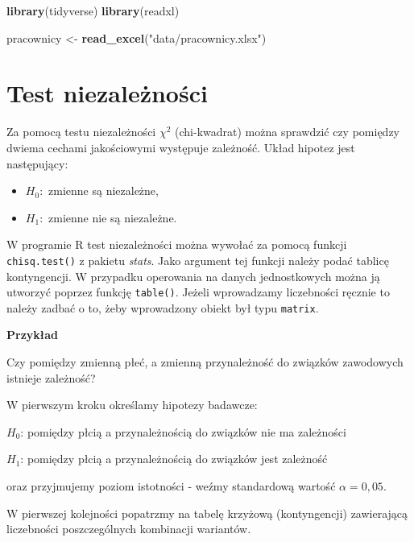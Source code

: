 \documentclass[
]{book}
\newenvironment{Shaded}{\begin{snugshade}}{\end{snugshade}}
\newcommand{\KeywordTok}[1]{\textcolor[rgb]{0.13,0.29,0.53}{\textbf{#1}}}
\newcommand{\NormalTok}[1]{#1}
\newcommand{\OperatorTok}[1]{\textcolor[rgb]{0.81,0.36,0.00}{\textbf{#1}}}
\newcommand{\StringTok}[1]{\textcolor[rgb]{0.31,0.60,0.02}{#1}}
\providecommand{\tightlist}{%
  \setlength{\itemsep}{0pt}\setlength{\parskip}{0pt}}
\begin{document}
\begin{Shaded}
\begin{Highlighting}[]
\KeywordTok{library}\NormalTok{(tidyverse)}
\KeywordTok{library}\NormalTok{(readxl)}

\NormalTok{pracownicy <-}\StringTok{ }\KeywordTok{read_excel}\NormalTok{(}\StringTok{"data/pracownicy.xlsx"}\NormalTok{)}
\end{Highlighting}
\end{Shaded}

\hypertarget{test-niezaleux17cnoux15bci}{%
\section{Test niezależności}\label{test-niezaleux17cnoux15bci}}

Za pomocą testu niezależności \(\chi^2\) (chi-kwadrat) można sprawdzić czy pomiędzy dwiema cechami jakościowymi występuje zależność. Układ hipotez jest następujący:

\begin{itemize}
\tightlist
\item
  \(H_0:\) zmienne są niezależne,
\item
  \(H_1:\) zmienne nie są niezależne.
\end{itemize}

W programie R test niezależności można wywołać za pomocą funkcji \texttt{chisq.test()} z pakietu \emph{stats}. Jako argument tej funkcji należy podać tablicę kontyngencji. W przypadku operowania na danych jednostkowych można ją utworzyć poprzez funkcję \texttt{table()}. Jeżeli wprowadzamy liczebności ręcznie to należy zadbać o to, żeby wprowadzony obiekt był typu \texttt{matrix}.

\textbf{Przykład}

Czy pomiędzy zmienną płeć, a zmienną przynależność do związków zawodowych istnieje zależność?

W pierwszym kroku określamy hipotezy badawcze:

\(H_0\): pomiędzy płcią a przynależnością do związków nie ma zależności

\(H_1\): pomiędzy płcią a przynależnością do związków jest zależność

oraz przyjmujemy poziom istotności - weźmy standardową wartość \(\alpha = 0,05\).

W pierwszej kolejności popatrzmy na tabelę krzyżową (kontyngencji) zawierającą liczebności poszczególnych kombinacji wariantów.

\begin{Shaded}
\end{Shaded}
\end{document}
